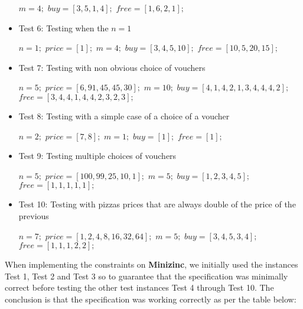 \documentclass[conference]{IEEEtran}
\newcommand\tab[1][0.3cm]{\hspace*{#1}}
\begin{document}
\begin{itemize}
\begin{algorithmic}
\State $m = 4;$
\State $buy = [3,5,1,4];$
\State $free = [1,6,2,1];$
\\
\end{algorithmic}
\item Test 6: Testing when the $n = 1$
\begin{algorithmic}
\State $n = 1;$
\State $price = [1];$
\State $m = 4;$
\State $buy = [3, 4, 5, 10];$
\State $free = [10,5,20,15];$
\\
\end{algorithmic}
\item Test 7: Testing with non obvious choice of vouchers
\begin{algorithmic}
\State $n = 5;$
\State $price = [6,91,45,45,30];$
\State $m = 10;$
\State $buy = [4,1,4,2,1,3,4,4,4,2];$
\State $free = [3,4,4,1,4,4,2,3,2,3];$
\\
\end{algorithmic}
\item Test 8: Testing with a simple case of a choice of a voucher
\begin{algorithmic}
\State $n = 2;$
\State $price = [7, 8];$
\State $m = 1;$
\State $buy = [1];$
\State $free = [1];$
\\
\end{algorithmic}
\item Test 9: Testing multiple choices of vouchers
\begin{algorithmic}
\State $n = 5;$
\State $price = [100, 99, 25, 10, 1];$
\State $m = 5;$
\State $buy = [1, 2, 3, 4, 5];$
\State $free = [1, 1, 1, 1, 1];$
\\
\end{algorithmic}
\item Test 10: Testing with pizzas prices that are always double of the price of the previous
\begin{algorithmic}
\State $n = 7;$
\State $price = [1, 2, 4, 8, 16, 32, 64];$
\State $m = 5;$
\State $buy = [3, 4, 5, 3, 4];$
\State $free = [1, 1, 1, 2, 2];$
\\
\end{algorithmic}
\end{itemize}
\tab When implementing the constraints on \textbf{Minizinc}, we initially used the instances Test 1, Test 2 and Test 3 so to guarantee that the specification was minimally correct before testing the other test instances Test 4 through Test 10. The conclusion is that the specification was working correctly as per the table below:
\\
\\
\end{document}
